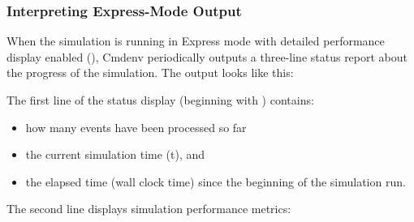 \subsubsection{Interpreting Express-Mode Output}
\label{sec:run-sim:cmdenv:express-mode:output}

When the simulation is running in Express mode with detailed
performance display enabled (), Cmdenv
periodically outputs a three-line status report about the progress of the simulation.
The output looks like this:


The first line of the status display (beginning with \ttt{**})
contains:

\begin{itemize}
   \item how many events have been processed so far
   \item the current simulation time (t), and
   \item the elapsed time (wall clock time) since the beginning of the simulation run.
\end{itemize}

The second line displays simulation performance metrics:

